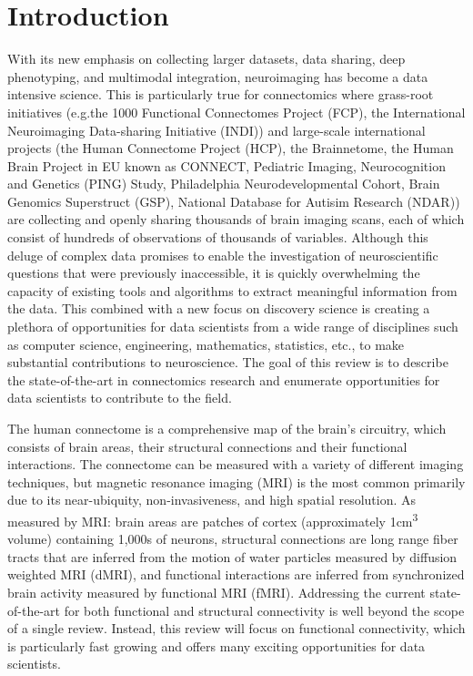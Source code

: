 \section{Introduction}

With its new emphasis on collecting larger datasets, data sharing, deep phenotyping, and multimodal integration, neuroimaging has become a data intensive science. This is particularly true for connectomics where grass-root initiatives (e.g.the 1000 Functional Connectomes Project (FCP)\cite{Biswal2010}, the International Neuroimaging Data-sharing Initiative (INDI)\cite{Mennes2013}) and large-scale international projects (the Human Connectome Project (HCP)\cite{RosenHCP2010,VanEssen2012}, the Brainnetome\cite{Jiang2013}, the Human Brain Project in EU known as CONNECT\cite{Assaf2013}, Pediatric Imaging, Neurocognition and Genetics (PING) Study\cite{JerniganPING}, Philadelphia Neurodevelopmental Cohort\cite{Satterthwaite2014},  Brain Genomics Superstruct (GSP)\cite{BucknerGSP2014}, National Database for Autisim Research (NDAR)\cite{NDAR}) are collecting and openly sharing thousands of brain imaging scans, each of which consist of hundreds of observations of thousands of variables. Although this deluge of complex data promises to enable the investigation of neuroscientific questions that were previously inaccessible, it is quickly overwhelming the capacity of existing tools and algorithms to extract meaningful information from the data. This combined with a new focus on discovery science is creating a plethora of opportunities for data scientists from a wide range of disciplines such as computer science, engineering, mathematics, statistics, etc., to make substantial contributions to neuroscience. The goal of this review is to describe the state-of-the-art in connectomics research and enumerate opportunities for data scientists to contribute to the field.

The human connectome is a comprehensive map of the brain's circuitry, which consists of brain areas, their structural connections and their functional interactions. The connectome can be measured with a variety of different imaging techniques, but magnetic resonance imaging (MRI) is the most common primarily due to its near-ubiquity, non-invasiveness, and high spatial resolution\cite{Craddock2013}. As measured by MRI: brain areas are patches of cortex (approximately 1\si{\centi\meter\cubed} volume) containing 1,000s of neurons\cite{Varela2001}, structural connections are long range fiber tracts that are inferred from the motion of water particles measured by diffusion weighted MRI (dMRI), and functional interactions are inferred from synchronized brain activity measured by functional MRI (fMRI)\cite{Behrens2012}. Addressing the current state-of-the-art for both functional and structural connectivity is well beyond the scope of a single review. Instead, this review will focus on functional connectivity, which is particularly fast growing and offers many exciting opportunities for data scientists.

